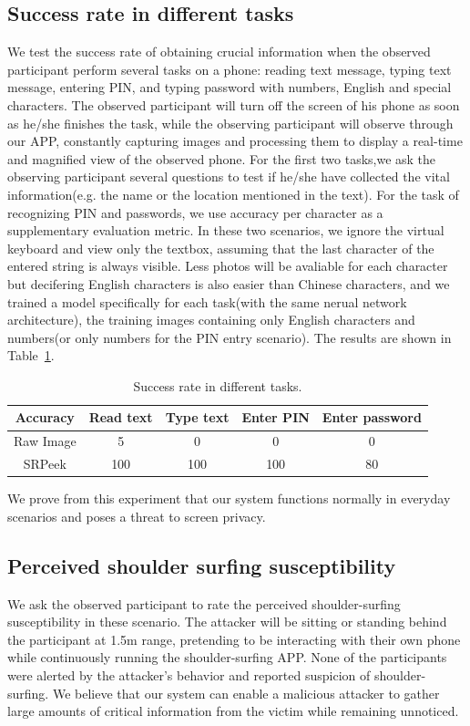 \subsection{Success rate in different tasks}
We test the success rate of obtaining crucial information when the observed participant perform several tasks on a phone: reading text message, typing text message, entering PIN, and typing password with numbers, English and special characters. The observed participant will turn off the screen of his phone as soon as he/she finishes the task, while the observing participant will observe through our APP, constantly capturing images and processing them to display a real-time and magnified view of the observed phone. For the first two tasks,we ask the observing participant several questions to test if he/she have collected the vital information(e.g. the name or the location mentioned in the text). For the task of recognizing PIN and passwords, we use accuracy per character as a supplementary evaluation metric. In these two scenarios, we ignore the virtual keyboard and view only the textbox, assuming that the last character of the entered string is always visible. Less photos will be avaliable for each character but decifering English characters is also easier than Chinese characters, and we trained a model specifically for each task(with the same nerual network architecture), the training images containing only English characters and numbers(or only numbers for the PIN entry scenario). The results are shown in Table~\ref{table-task}.

\begin{table}[!t]
\centering
\begin{tabular}{@{}ccccc@{}}
	\toprule
Accuracy & Read text & Type text & Enter PIN & Enter password\\ \midrule
Raw Image & 5 & 0 & 0 & 0\\
SRPeek & 100 & 100 & 100 & 80\\ \bottomrule
\end{tabular}
\caption{Success rate in different tasks.}
\label{table-task}
\end{table}

We prove from this experiment that our system functions normally in everyday scenarios and poses a threat to screen privacy.

\subsection{Perceived shoulder surfing susceptibility}
We ask the observed participant to rate the perceived shoulder-surfing susceptibility in these scenario. The attacker will be sitting or standing behind the participant at 1.5m range, pretending to be interacting with their own phone while continuously running the shoulder-surfing APP. None of the participants were alerted by the attacker's behavior and reported suspicion of shoulder-surfing. We believe that our system can enable a malicious attacker to gather large amounts of critical information from the victim while remaining unnoticed.




